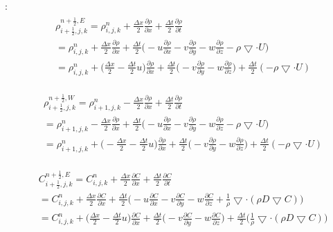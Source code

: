 \documentclass{article}
\numberwithin{equation}{subsection}
\begin{document}
:
\begin{align}
\begin{split}
& \rho_{i+\frac{1}{2},j,k}^{n+\frac{1}{2},E} = \rho_{i,j,k}^n + \frac{\Delta x}{2} \frac{\partial \rho}{\partial x} + \frac{\Delta t}{2} \frac{\partial \rho}{\partial t} \\
& = \rho_{i,j,k}^{n} + \frac{\Delta x}{2} \frac{\partial \rho}{\partial x} + \frac{\Delta t}{2} \Big( -u\frac{\partial \rho}{\partial x} - v\frac{\partial \rho}{\partial y} - w\frac{\partial \rho}{\partial z} - \rho \bigtriangledown \cdot U \Big) \\
& = \rho_{i,j,k}^{n} + \big( \frac{\Delta x}{2} - \frac{\Delta t}{2}u\big)\frac{\partial \rho}{\partial x} + \frac{\Delta t}{2} \big( - v\frac{\partial \rho}{\partial y} - w\frac{\partial \rho}{\partial z} \big) + \frac{\Delta t}{2} (-\rho \bigtriangledown \cdot U)
\end{split}
\end{align}

\begin{align}
\begin{split}
& \rho_{i+\frac{1}{2},j,k}^{n+\frac{1}{2},W} = \rho_{i+1,j,k}^n - \frac{\Delta x}{2} \frac{\partial \rho}{\partial x} + \frac{\Delta t}{2} \frac{\partial \rho}{\partial t} \\
& = \rho_{i+1,j,k}^{n} - \frac{\Delta x}{2} \frac{\partial \rho}{\partial x} + \frac{\Delta t}{2} \Big( -u\frac{\partial \rho}{\partial x} - v\frac{\partial \rho}{\partial y} - w\frac{\partial \rho}{\partial z} - \rho \bigtriangledown \cdot U \Big) \\
& = \rho_{i+1,j,k}^{n} + \big( -\frac{\Delta x}{2} - \frac{\Delta t}{2}u\big)\frac{\partial \rho}{\partial x} + \frac{\Delta t}{2} \big( - v\frac{\partial \rho}{\partial y} - w\frac{\partial \rho}{\partial z} \big) + \frac{\Delta t}{2} (-\rho \bigtriangledown \cdot U)
\end{split}
\end{align}

\begin{align}
\begin{split}
& C_{i+\frac{1}{2},j,k}^{n+\frac{1}{2},E} = C_{i,j,k}^n + \frac{\Delta x}{2} \frac{\partial C}{\partial x} + \frac{\Delta t}{2} \frac{\partial C}{\partial t} \\
&= C_{i,j,k}^{n} + \frac{\Delta x}{2} \frac{\partial C}{\partial x} + \frac{\Delta t}{2} \Big( -u\frac{\partial C}{\partial x} - v\frac{\partial C}{\partial y} - w\frac{\partial C}{\partial z} + \frac{1}{\rho} \bigtriangledown \cdot( \rho D \bigtriangledown C) \Big) \\
&= C_{i,j,k}^{n} + \Big( \frac{\Delta x}{2} - \frac{\Delta t}{2}u\Big)\frac{\partial C}{\partial x} + \frac{\Delta t}{2} \Big( -v\frac{\partial C}{\partial y} -w\frac{\partial C}{\partial z} \big) + \frac{\Delta t}{2} \Big( \frac{1}{\rho} \bigtriangledown \cdot( \rho D \bigtriangledown C)\Big)
\end{split}
\end{align}
\end{document}
